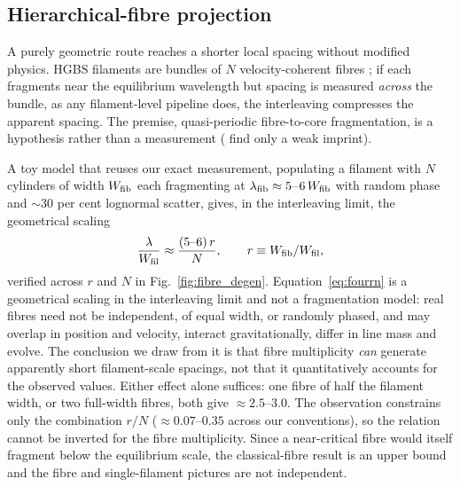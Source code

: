 \documentclass[usenatbib,twoside,twocolumn]{mnras}
\begin{document}
\subsection{Hierarchical-fibre projection}
\label{sec:fibre_projection}

A purely geometric route reaches a shorter local spacing without modified physics. HGBS filaments are bundles of $N$ velocity-coherent fibres \citep{Hacar2013,Hacar2018,Yang2024}; if each fragments near the equilibrium wavelength but spacing is measured \emph{across} the bundle, as any filament-level pipeline does, the interleaving compresses the apparent spacing. The premise, quasi-periodic fibre-to-core fragmentation, is a hypothesis rather than a measurement (\citealt{Yang2024} find only a weak imprint).

A toy model that reuses our exact measurement, populating a filament with $N$ cylinders of width $W_{\rm fib}$ each fragmenting at $\lambda_{\rm fib}\approx5$--$6\,W_{\rm fib}$ with random phase and $\sim30$ per cent lognormal scatter, gives, in the interleaving limit, the geometrical scaling
\begin{equation}
\frac{\lambda}{W_{\rm fil}}\approx\frac{(5\text{--}6)\,r}{N},\qquad r\equiv W_{\rm fib}/W_{\rm fil},
\label{eq:fourrn}
\end{equation}
verified across $r$ and $N$ in Fig.~\ref{fig:fibre_degen}. Equation~\ref{eq:fourrn} is a geometrical scaling in the interleaving limit and not a fragmentation model: real fibres need not be independent, of equal width, or randomly phased, and may overlap in position and velocity, interact gravitationally, differ in line mass and evolve. The conclusion we draw from it is that fibre multiplicity \emph{can} generate apparently short filament-scale spacings, not that it quantitatively accounts for the observed values. Either effect alone suffices: one fibre of half the filament width, or two full-width fibres, both give $\approx2.5$--$3.0$. The observation constrains only the combination $r/N$ ($\approx0.07$--$0.35$ across our conventions), so the relation cannot be inverted for the fibre multiplicity. Since a near-critical fibre would itself fragment below the equilibrium scale, the classical-fibre result is an upper bound and the fibre and single-filament pictures are not independent.
\end{document}
